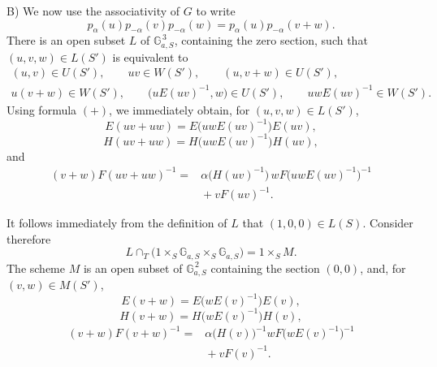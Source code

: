 
\textup{B)} We now use the associativity of \(G\) to write
\[
  p_\alpha(u)p_{-\alpha}(v)p_{-\alpha}(w)
    =p_\alpha(u)p_{-\alpha}(v+w).
\]
There is an open subset \(L\) of
\(\mathbb G_{a,S}^{\,3}\), containing the zero section, such that
\((u,v,w)\in L(S')\) is equivalent to
\[
\begin{gathered}
  (u,v)\in U(S'),\qquad uv\in W(S'),\qquad
  (u,v+w)\in U(S'),\\
  u(v+w)\in W(S'),\qquad
  \bigl(uE(uv)^{-1},w\bigr)\in U(S'),\qquad
  uwE(uv)^{-1}\in W(S').
\end{gathered}
\]
Using formula \((+)\), we immediately obtain, for
\((u,v,w)\in L(S')\),
\begin{equation}\tag{1}
  E(uv+uw)=E\bigl(uwE(uv)^{-1}\bigr)E(uv),
\end{equation}
\begin{equation}\tag{2}
  H(uv+uw)=H\bigl(uwE(uv)^{-1}\bigr)H(uv),
\end{equation}
and
\begin{equation}\tag{3}
\begin{split}
  (v+w)F(uv+uw)^{-1}
   ={}&\alpha\bigl(H(uv)^{-1}\bigr)\,
        wF\bigl(uwE(uv)^{-1}\bigr)^{-1}\\
     &{}+vF(uv)^{-1}.
\end{split}
\end{equation}

It follows immediately from the definition of \(L\) that
\((1,0,0)\in L(S)\). Consider therefore
\[
  L\cap_T
    \bigl(1\times_S\mathbb G_{a,S}\times_S\mathbb G_{a,S}\bigr)
      =1\times_S M.
\]
The scheme \(M\) is an open subset of
\(\mathbb G_{a,S}^{\,2}\) containing the section \((0,0)\), and,
for \((v,w)\in M(S')\),
\begin{equation}\tag{1'}
  E(v+w)=E\bigl(wE(v)^{-1}\bigr)E(v),
\end{equation}
\begin{equation}\tag{2'}
  H(v+w)=H\bigl(wE(v)^{-1}\bigr)H(v),
\end{equation}
\begin{equation}\tag{3'}
\begin{split}
  (v+w)F(v+w)^{-1}
   ={}&\alpha\bigl(H(v)\bigr)^{-1}
        wF\bigl(wE(v)^{-1}\bigr)^{-1}\\
     &{}+vF(v)^{-1}.
\end{split}
\end{equation}

